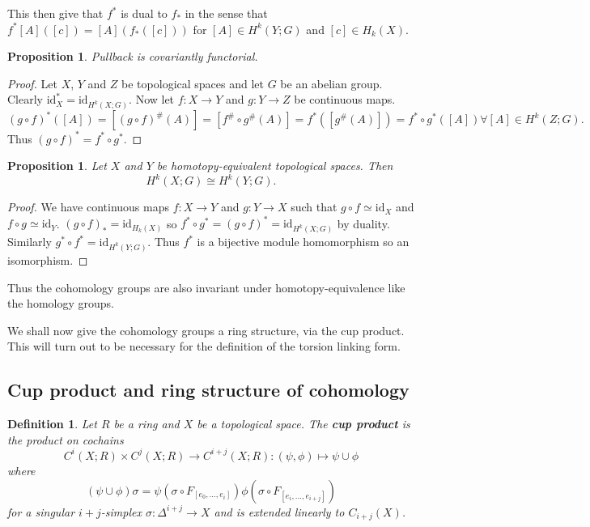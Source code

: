 \documentclass{article}
\newtheorem{definition}[theorem]{Definition}
\newtheorem{proposition}[theorem]{Proposition}
\begin{document}
\noindent This then give that $f^*$ is dual to $f_*$ in the sense that $f^*[A]([c])=[A](f_*([c]))$ for $[A]\in H^k(Y;G)$ and $[c]\in H_k(X)$.

\begin{proposition}
Pullback is covariantly functorial.
\end{proposition}
\begin{proof}
Let $X$, $Y$ and $Z$ be topological spaces and let $G$ be an abelian group. 
Clearly $\text{id}_X^*=\text{id}_{H^k(X;G)}$.
Now let $f\colon X\to Y$ and $g\colon Y\to Z$ be continuous maps. \[(g\circ f)^*([A])=[(g\circ f)^\#(A)]=[f^\#\circ g^\#(A)]=f^*([g^\#(A)])=f^*\circ g^*([A])\forall [A]\in H^k(Z;G).\] Thus $(g\circ f)^*=f^*\circ g^*$.
\end{proof}

\begin{proposition}
Let $X$ and $Y$ be homotopy-equivalent topological spaces. Then \[H^k(X;G)\cong H^k(Y;G).\]
\end{proposition}
\begin{proof}
We have continuous maps $f\colon X\to Y$ and $g\colon Y\to X$ such that $g\circ f\simeq\text{id}_X$ and $f\circ g\simeq\text{id}_Y$. $(g\circ f)_*=\text{id}_{H_k(X)}$ so $f^*\circ g^*=(g\circ f)^*=\text{id}_{H^k(X;G)}$ by duality. Similarly $g^*\circ f^*=\text{id}_{H^k(Y;G)}$. Thus $f^*$ is a bijective module homomorphism so an isomorphism.
\end{proof}
\noindent Thus the cohomology groups are also invariant under homotopy-equivalence like the homology groups.

\noindent We shall now give the cohomology groups a ring structure, via the cup product. This will turn out to be necessary for the definition of the torsion linking form.

\subsection{Cup product and ring structure of cohomology}
\begin{definition}
Let $R$ be a ring and $X$ be a topological space. The \textbf{cup product} is the product on cochains\[C^i(X;R)\times C^j(X;R)\to C^{i+j}(X;R):(\psi,\phi)\mapsto\psi\cup\phi\] where \[(\psi\cup\phi)\sigma=\psi(\sigma\circ F_{[e_0,...,e_i]})\phi(\sigma\circ F_{[e_i,...,e_{i+j}]})\] for a singular $i+j$-simplex $\sigma\colon\Delta^{i+j}\to X$ and is extended linearly to $C_{i+j}(X)$.
\end{definition}
\end{document}
